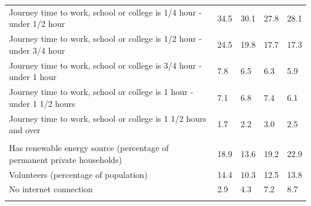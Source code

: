 \documentclass{article}
\begin{document}
\begin{table}[h]
\begin{tabular}{KTTTT}
Journey time to work, school or college is 1/4 hour - under 1/2 hour & 34.5& 30.1& 27.8& 28.1\\
Journey time to work, school or college is 1/2 hour - under 3/4 hour & 24.5& 19.8& 17.7& 17.3\\
Journey time to work, school or college is 3/4 hour - under 1 hour & 7.8& 6.5& 6.3& 5.9\\
Journey time to work, school or college is 1 hour - under 1 1/2 hours & 7.1& 6.8& 7.4& 6.1\\
Journey time to work, school or college is 1 1/2 hours and over & 1.7& 2.2& 3.0& 2.5\\
\hline
    \\ 
    \hline
Has renewable energy source (percentage of permanent private households) & 18.9& 13.6& 19.2& 22.9\\
    \hline
Volunteers (percentage of population) & 14.4& 10.3& 12.5& 13.8\\
    \hline
No internet connection& 2.9& 4.3& 7.2& 8.7\\
\hline
\end{tabular}
\end{table}
\end{document}
